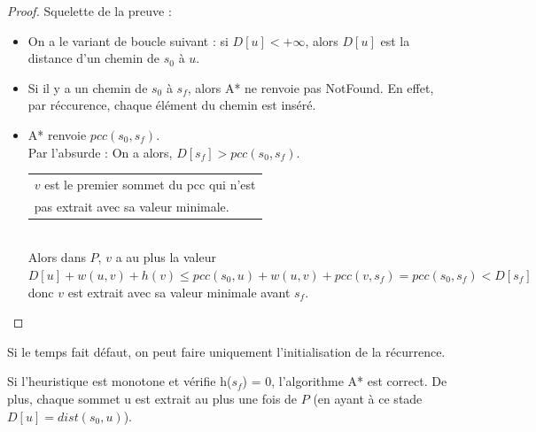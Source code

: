 \begin{proof}
	Squelette de la preuve : \begin{itemize}[label = $\star$]
		\item On a le variant de boucle suivant : si $D[u] < +\infty$, alors $D[u]$ est la distance d'un chemin de $s_0$ à $u$.
		\item Si il y a un chemin de $s_0$ à $s_f$, alors A* ne renvoie pas NotFound. En effet, par réccurence, chaque élément du chemin est inséré.
		\item A* renvoie $pcc(s_0, s_f)$. \\
		Par l'absurde : On a alors, $D[s_f] > pcc(s_0, s_f)$.\\
		 \begin{tabular}{l}$v$ est le premier sommet du pcc qui n'est \\ pas extrait avec sa valeur minimale. \end{tabular} \\
		Alors dans $P$, $v$ a au plus la valeur $D[u] + w(u,v) + h(v) \leq pcc(s_0, u) + w(u,v) + pcc(v, s_f) = pcc(s_0, s_f) < D[s_f]$ donc $v$ est extrait avec sa valeur minimale avant $s_f$.
	\end{itemize}
\end{proof}
\begin{com}
	Si le temps fait défaut, on peut faire uniquement l'initialisation de la récurrence.
\end{com}

\begin{theorem}
	Si l'heuristique est monotone et vérifie h($s_{f}$) = 0, l'algorithme A* est correct. De plus, chaque sommet u est extrait au plus une fois de $P$ (en ayant à ce stade $D[u] = dist(s_{0}, u)$).
\end{theorem}

